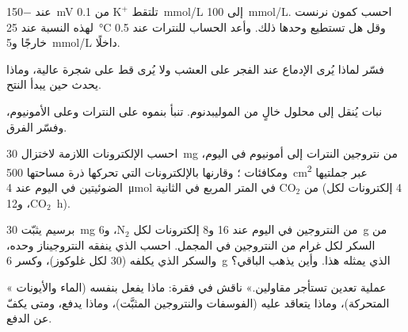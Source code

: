 \begin{exercise}[$\star\star$]\label{exo:b1:plant-water-minerals:7}
  عند \qty{-150}{mV} تلتقط $\mathrm{K^+}$ من
\qty{0.1}{mmol/L} إلى \qty{100}{mmol/L}. احسب كمون نرنست لهذه
النسبة عند \qty{25}{\celsius} وقل هل تستطيع  وحدها ذلك.
وأعد الحساب للنترات عند \qty{0.5}{} خارجًا و\qty{5}{mmol/L} داخلًا.
\end{exercise}

\begin{exercise}[$\star\star$]\label{exo:b1:plant-water-minerals:8}
فسّر لماذا يُرى الإدماع عند الفجر على العشب ولا يُرى قط على شجرة
عالية، وماذا يحدث  حين يبدأ النتح.
\end{exercise}

\begin{exercise}[$\star\star$]\label{exo:b1:plant-water-minerals:9}
نبات يُنقل إلى محلول خالٍ من الموليبدنوم. تنبأ بنموه على النترات
وعلى الأمونيوم، وفسّر الفرق.
\end{exercise}

\begin{exercise}[$\star\star\star$]\label{exo:b1:plant-water-minerals:10}
احسب الإلكترونات اللازمة لاختزال \qty{30}{mg} من نتروجين النترات
إلى أمونيوم في اليوم، ومكافئات ؛ وقارنها بالإلكترونات التي
تحركها  ذرة مساحتها \qty{500}{cm^2} عبر جملتيها الضوئيتين في
اليوم عند \qty{4}{\micro mol} من $\mathrm{CO_2}$ في المتر المربع
في الثانية (4 إلكترونات لكل $\mathrm{CO_2}$، و\qty{12}{h}).
\end{exercise}

\begin{exercise}[$\star\star\star$]\label{exo:b1:plant-water-minerals:11}
برسيم يثبّت \qty{30}{mg} من النتروجين في اليوم عند \qty{16}{} 
و\qty{8}{} إلكترونات لكل $\mathrm{N_2}$، و\qty{6}{g} من السكر لكل
غرام من النتروجين في المجمل. احسب  الذي ينفقه النتروجيناز وحده،
والسكر الذي يكلفه (30  لكل غلوكوز)، وكسر \qty{6}{g} الذي يمثله
هذا. وأين يذهب الباقي؟
\end{exercise}

\begin{exercise}[$\star\star\star$]\label{exo:b1:plant-water-minerals:12}
« عملية تعدين تستأجر مقاولين.» ناقش في فقرة: ماذا يفعل 
بنفسه (الماء والأيونات المتحركة)، وماذا يتعاقد عليه (الفوسفات
والنتروجين المثبَّت)، وماذا يدفع، ومتى يكفّ عن الدفع.
\end{exercise}

